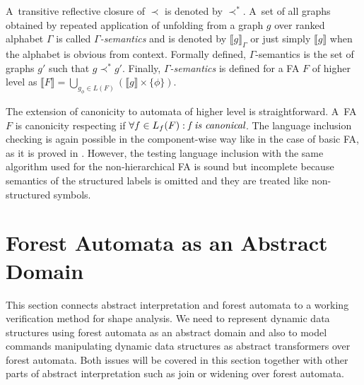 \documentclass[a4paper, 12pt]{article}
\begin{document}
A~transitive reflective closure of $\prec$ is denoted by $\prec^*$.
A~set of all graphs obtained by repeated application of unfolding from
a graph $g$ over ranked alphabet $\Gamma$ is called \emph{$\Gamma$-semantics}
and is denoted by $\llbracket g \rrbracket_\Gamma$ or just simply $\llbracket g \rrbracket$ when
the alphabet is obvious from context.
Formally defined, $\Gamma$-semantics is the set of graphs $g'$ such that $g \prec^* g'$.
Finally, \emph{$\Gamma$-semantics} is defined for a FA $F$ of higher level as
$\llbracket F \rrbracket = \bigcup_{g_\phi \in L(F)} (\llbracket g \rrbracket \times \{\phi\})$.

The extension of canonicity to automata of higher level is straightforward.
A~FA $F$ is canonicity respecting if $\forall f \in L_f(F): \emph{f is canonical}$.
The language inclusion checking is again possible in the component-wise way like in the case of basic FA,
as it is proved in \cite{cav11}.
However, the testing language inclusion with the same algorithm used for the non-hierarchical FA
is sound but incomplete because semantics of the structured labels is omitted
and they are treated like non-structured symbols.

\section{Forest Automata as an Abstract Domain}
\label{sec:analysis}

This section connects abstract interpretation
and forest automata to a working verification method for shape analysis.
We need to represent dynamic data structures
using forest automata as an abstract domain and
also to model commands manipulating dynamic data structures
as abstract transformers over forest automata.
Both issues will be covered in this section together with
other parts of abstract interpretation such as join or widening
over forest automata.
\end{document}

